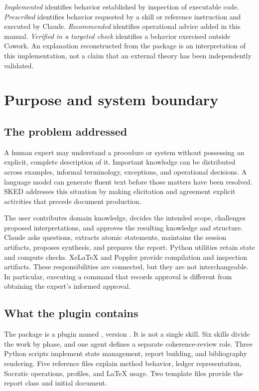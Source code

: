 \documentclass[12pt,a4paper]{article}
\newcommand{\code}[1]{\texttt{\detokenize{#1}}}
\begin{document}
\emph{Implemented} identifies behavior established by inspection of executable code. \emph{Prescribed} identifies behavior requested by a skill or reference instruction and executed by Claude. \emph{Recommended} identifies operational advice added in this manual. \emph{Verified in a targeted check} identifies a behavior exercised outside Cowork. An explanation reconstructed from the package is an interpretation of this implementation, not a claim that an external theory has been independently validated.

\tableofcontents
\clearpage

\section{Purpose and system boundary}
\subsection{The problem addressed}
A human expert may understand a procedure or system without possessing an explicit, complete description of it. Important knowledge can be distributed across examples, informal terminology, exceptions, and operational decisions. A language model can generate fluent text before those matters have been resolved. SKED addresses this situation by making elicitation and agreement explicit activities that precede document production.

The user contributes domain knowledge, decides the intended scope, challenges proposed interpretations, and approves the resulting knowledge and structure. Claude asks questions, extracts atomic statements, maintains the session artifacts, proposes synthesis, and prepares the report. Python utilities retain state and compute checks. XeLaTeX and Poppler provide compilation and inspection artifacts. These responsibilities are connected, but they are not interchangeable. In particular, executing a command that records approval is different from obtaining the expert's informed approval.

\subsection{What the plugin contains}
The package is a plugin named \code{sked}, version \code{0.1.0}. It is not a single skill. Six skills divide the work by phase, and one agent defines a separate coherence-review role. Three Python scripts implement state management, report building, and bibliography rendering. Five reference files explain method behavior, ledger representation, Socratic operations, profiles, and LaTeX usage. Two template files provide the report class and initial document.
\end{document}
